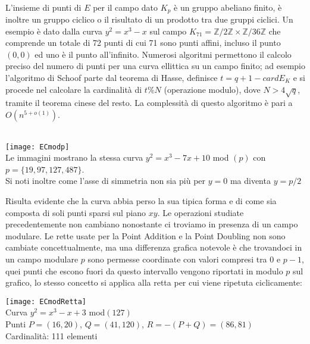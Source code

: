 \documentclass[a4paper,12pt]{tesiinfo}
\begin{document}
\\
L'insieme di punti di $E$ per il campo dato $K_p$ \`e un gruppo abeliano finito, \`e inoltre un gruppo ciclico o il risultato di un prodotto tra due gruppi ciclici. Un esempio \`e dato dalla curva $y^2 = x^3 - x$ sul campo $K_{71} = \mathbb{Z}/2\mathbb{Z}\times\mathbb{Z}/36\mathbb{Z}$ che comprende un totale di 72 punti di cui 71 sono punti affini, incluso il punto $(0,0)$ ed uno \`e il punto all'infinito.
Numerosi algoritmi permettono il calcolo preciso del numero di punti per una curva ellittica su un campo finito; ad esempio l'algoritmo di Schoof parte dal teorema di Hasse, definisce $t = q+1-cardE_K$ e si procede nel calcolare la cardinalit\`a di $t\%N$ (operazione modulo), dove $N > 4\sqrt{q}$, tramite il teorema cinese del resto. La complessit\`a di questo algoritmo \`e pari a $O(n^{5+o(1)})$.
%
\\
\\
\begin{center}
\texttt{[image: ECmodp]}\\
Le immagini mostrano la stessa curva $y^2=x^3-7x+10$ mod $(p)$ con \\
$p = \{19, 97, 127, 487\}$.\\
Si noti inoltre come l'asse di simmetria non sia pi\`u per $y=0$ ma diventa $y=p\big / 2$
\end{center}
Risulta evidente che la curva abbia perso la sua tipica forma e di come sia composta di soli punti sparsi sul piano $xy$. Le operazioni studiate precedentemente non cambiano nonostante ci troviamo in presenza di un campo modulare. Le rette usate per la Point Addition e la Point Doubling non sono cambiate concettualmente, ma una differenza grafica notevole \`e che trovandoci in un campo modulare $p$ sono permesse coordinate con valori compresi tra $0$ e $p-1$, quei punti che escono fuori da questo intervallo vengono riportati in modulo $p$ sul grafico, lo stesso concetto si applica alla retta per cui viene ripetuta ciclicamente:
\begin{center}
\texttt{[image: ECmodRetta]}\\
Curva $y^2=x^3-x+3$ mod$(127)$\\
Punti $P = (16, 20)$, $Q=(41, 120)$, $R = -(P+Q) = (86, 81)$\\
Cardinalit\`a: 111 elementi
\end{center}
\end{document}
